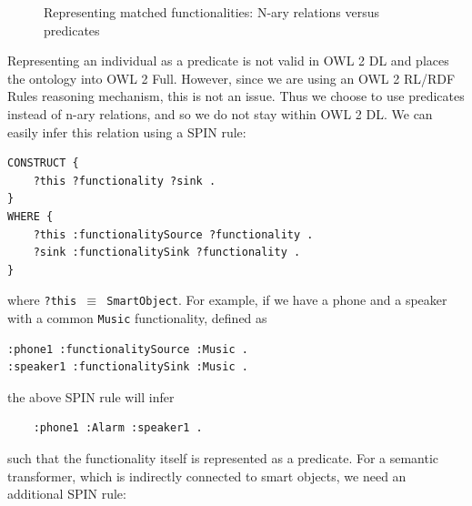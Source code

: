 \begin{figure}[bth]\centerline{
	}	
        \caption{Representing matched functionalities: N-ary relations versus predicates}
        \label{naryFunctionality}
\end{figure}

Representing an individual as a predicate is not valid in OWL 2 DL and places the ontology into OWL 2 Full. However, since we are using an OWL 2 RL/RDF Rules reasoning mechanism, this is not an issue. Thus we choose to use predicates instead of n-ary relations, and so we do not stay within OWL 2 DL. We can easily infer this relation using a \ac{SPIN} rule:

\begin{verbatim}
CONSTRUCT {
    ?this ?functionality ?sink .
}
WHERE {
    ?this :functionalitySource ?functionality .
    ?sink :functionalitySink ?functionality .
}
\end{verbatim}

where \texttt{?this \ensuremath{\equiv} SmartObject}. For example, if we have a phone and a speaker with a common \texttt{Music} functionality, defined as

\begin{verbatim}
:phone1 :functionalitySource :Music .
:speaker1 :functionalitySink :Music .
\end{verbatim}

the above \ac{SPIN} rule will infer

\begin{verbatim}
	:phone1 :Alarm :speaker1 .
\end{verbatim}

such that the functionality itself is represented as a predicate. For a semantic transformer, which is indirectly connected to smart objects, we need an additional \ac{SPIN} rule:

